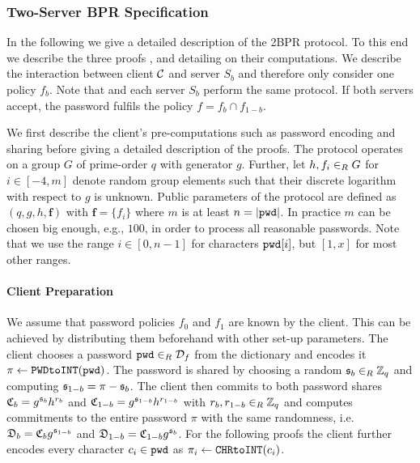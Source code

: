 \subsubsection{Two-Server BPR Specification}\label{sec:protocol}
In the following we give a detailed description of the 2BPR protocol.
To this end we describe the three proofs \PoC, \PoM and \PoS detailing on their computations.
We describe the interaction between client $\mathcal{C}$ and server $S_b$ and therefore only consider one policy $f_b$.
Note that \cC and each server $S_b$ perform the same protocol.
If both servers accept, the password fulfils the policy $f=f_b\cap f_{1-b}$.

We first describe the client's pre-computations such as password encoding and sharing before giving a detailed description of the proofs.
The protocol operates on a group $G$ of prime-order $q$ with generator $g$.
Further, let $h,f_i\in_R G$ for $i\in[-4,m]$ denote random group elements such that their discrete logarithm with respect to $g$ is unknown.
Public parameters of the protocol are defined as $(q,g,h,\bm f)$ with $\bm f = \{f_i\}$ where $m$ is at least $n=|\mathtt{pwd}|$.
In practice $m$ can be chosen big enough, e.g., $100$, in order to process all reasonable passwords.
Note that we use the range $i\in[0,n-1]$ for characters $\mathtt{pwd}[i]$, but $[1,x]$ for most other ranges.

\paragraph{Client Preparation}
We assume that password policies $f_0$ and $f_1$ are known by the client.
This can be achieved by distributing them beforehand with other set-up parameters.
The client chooses a password $\mathtt{pwd}\in_R\mathcal{D}_f$ from the dictionary and encodes it $\pi\gets\texttt{PWDtoINT}(\mathtt{pwd})$.
The password is shared by choosing a random $\mathfrak{s}_{b}\in_R\mathbb{Z}_q$ and computing $\mathfrak{s}_{1-b}=\pi-\mathfrak{s}_{b}$.
The client then commits to both password shares $\mathfrak{C}_b=g^{\mathfrak{s}_{b}}h^{r_b}$ and $\mathfrak{C}_{1-b}=g^{\mathfrak{s}_{1-b}}h^{r_{1-b}}$ with $r_b,r_{1-b}\in_R\mathbb{Z}_q$ and computes commitments to the entire password $\pi$ with the same randomness, i.e. $\mathfrak{D}_b=\mathfrak{C}_b g^{\mathfrak{s}_{1-b}}$ and $\mathfrak{D}_{1-b}=\mathfrak{C}_{1-b} g^{\mathfrak{s}_{b}}$.
For the following proofs the client further encodes every character $c_i\in\mathtt{pwd}$ as $\pi_i\gets\texttt{CHRtoINT}(c_i)$.

